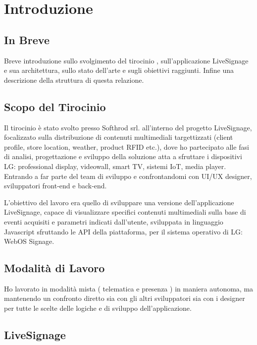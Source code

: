 \chapter{Introduzione}
\linespread{1.5}

\section{In Breve}
Breve introduzione sullo  svolgimento del tirocinio , sull'applicazione LiveSignage e sua architettura, sullo stato dell'arte e sugli obiettivi raggiunti. Infine una descrizione della struttura di questa relazione.

\section{Scopo del Tirocinio}

Il tirocinio è stato svolto presso Softhrod srl. all'interno del progetto LiveSignage, focalizzato sulla distribuzione di contenuti multimediali targettizzati (client profile, store location, weather, product RFID etc.), dove ho partecipato alle fasi di analisi, progettazione e sviluppo della soluzione atta a sfruttare i dispositivi LG: professional display, videowall, smart TV, sistemi IoT, media player. Entrando a far parte del team di sviluppo e confrontandomi con UI/UX designer, sviluppatori front-end e back-end.

L'obiettivo del lavoro era quello di sviluppare una versione dell'applicazione LiveSignage, capace di visualizzare specifici contenuti multimediali sulla base di eventi acquisiti e parametri indicati dall'utente, sviluppata in linguaggio Javascript sfruttando le API  della piattaforma, per il sistema operativo di LG: WebOS Signage.

\section{Modalità di Lavoro}

Ho lavorato in modalità mista ( telematica e presenza ) in maniera autonoma, ma mantenendo un confronto diretto sia con gli altri sviluppatori sia con i designer per tutte le scelte delle logiche e di sviluppo dell'applicazione. 

\section{LiveSignage}


